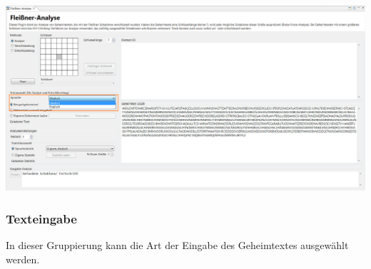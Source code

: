 \documentclass[fontsize=12pt, DIV=15, parskip=half-]{scrartcl}
\theoremstyle{break}
\begin{document}
\includegraphics[scale=0.45]{FleissnerLanguage.png}
\newpage

\subsubsection{Texteingabe}\hypertarget{txteing}{}
In dieser Gruppierung kann die Art der Eingabe des Geheimtextes ausgewählt werden.
\end{document}
